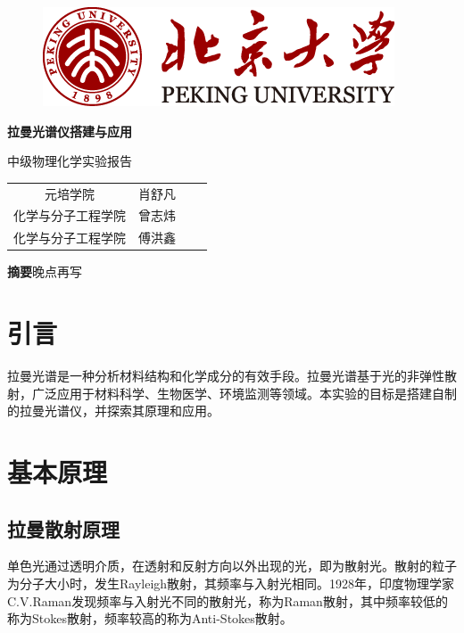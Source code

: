 \documentclass[UTF8]{article}
\newcommand{\expname}{中级物理化学实验报告}
\begin{document}
	
	\begin{titlepage}
		\vspace*{1cm}
		\begin{figure}[h]
			\centering
			\includegraphics[width=0.7\linewidth]{logo}
		\end{figure}
		
		\vspace*{0.5cm}
		
		\begin{center}
			\Huge{\textbf{拉曼光谱仪搭建与应用}}
			
			\Large{\expname}
		\end{center}
		
		\vspace*{0.5cm}
		
		\begin{table}[h]
			\centering
				\begin{tabular}{cccc}
					元培学院 & 肖舒凡 \\
					化学与分子工程学院  & 曾志炜 \\
					化学与分子工程学院  & 傅洪鑫 \\
				\end{tabular}
		\end{table}
	
	\vspace*{1cm}
	
	\textbf{摘要}\quad  晚点再写
	
	\end{titlepage}
	
	\normalsize

	\section{引言}
	拉曼光谱是一种分析材料结构和化学成分的有效手段。拉曼光谱基于光的非弹性散射，广泛应用于材料科学、生物医学、环境监测等领域。本实验的目标是搭建自制的拉曼光谱仪，并探索其原理和应用。
	

	\section{基本原理}
	\subsection{拉曼散射原理}
	单色光通过透明介质，在透射和反射方向以外出现的光，即为散射光。散射的粒子为分子大小时，发生Rayleigh散射，其频率与入射光相同。1928年，印度物理学家C.V.Raman发现频率与入射光不同的散射光，称为Raman散射，其中频率较低的称为Stokes散射，频率较高的称为Anti-Stokes散射。
	
\end{document}
